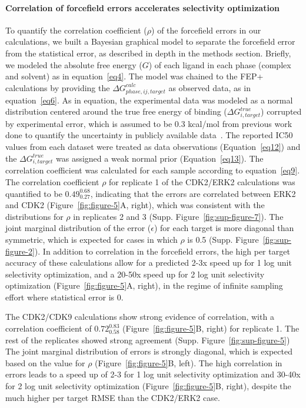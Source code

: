 \documentclass[9pt,lineno]{elife-modified} %
\begin{document}
\paragraph{Correlation of forcefield errors accelerates selectivity optimization}
To quantify the correlation coefficient ($
\rho$) of the forcefield errors in our calculations, we built a Bayesian graphical model to separate the forcefield error from the statistical error, as described in depth in the methods section. Briefly, we modeled the absolute free energy ($G$) of each ligand in each phase (complex and solvent) as in equation~\ref{eq4}. The model was chained to the FEP+ calculations by providing the $\Delta G^{calc}_{phase,ij,target}$ as observed data, as in equation~\ref{eq6}. As in equation, the experimental data was modeled as a normal distribution centered around the true free energy of binding ($\Delta G^{true}_{i,target}$) corrupted by experimental error, which is assumed to be 0.3 kcal/mol from previous work done to quantify the uncertainty in publicly available data~\citep{BROWN2009420}. The reported IC50 values from each dataset were treated as data observations (Equation~\ref{eq12}) and the $\Delta G^{true}_{i,target}$ was assigned a weak normal prior (Equation~\ref{eq13}). The correlation coefficient was calculated for each sample according to equation~\ref{eq9}. 
The correlation coefficient $\rho$ for replicate 1 of the CDK2/ERK2 calculations was quantified to be $0.49^{0.68}_{0.27}$, indicating that the errors are correlated between ERK2 and CDK2 (Figure~\ref{fig:figure-5}A, right), which was consistent with the distributions for $\rho$ in replicates 2 and 3 (Supp. Figure~\ref{fig:sup-figure-7}). The joint marginal distribution of the error ($\epsilon$) for each target is more diagonal than symmetric, which is expected for cases in which $\rho$ is 0.5 (Supp. Figure~\ref{fig:sup-figure-2}). In addition to correlation in the forcefield errors, the high per target accuracy of these calculations allow for a predicted 2-3x speed up for 1 log unit selectivity optimization, and a 20-50x speed up for 2 log unit selectivity optimization (Figure~\ref{fig:figure-5}A, right), in the regime of infinite sampling effort where statistical error is 0. 

The CDK2/CDK9 calculations show strong evidence of correlation, with a correlation coefficient of $0.72^{0.83}_{0.58}$ (Figure~\ref{fig:figure-5}B, right) for replicate 1. The rest of the replicates showed strong agreement (Supp. Figure~\ref{fig:sup-figure-5}) The joint marginal distribution of errors is strongly diagonal, which is expected based on the value for $\rho$ (Figure~\ref{fig:figure-5}B, left). The high correlation in errors leads to a speed up of 2-3 for 1 log unit selectivity optimization and 30-40x for 2 log unit selectivity optimization (Figure~\ref{fig:figure-5}B, right), despite the much higher per target RMSE than the CDK2/ERK2 case. 
\end{document}
